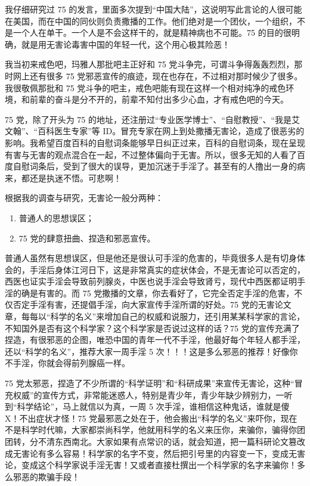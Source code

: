 \documentclass{ctexart}
\begin{document}
我仔细研究过 75 的发言，里面多次提到“中国大陆”，这说明写此言论的人很可能在美国，而在中国的同伙则负责撒播的工作。他们绝对是一个团伙，一个组织，不是一个人在单干。一个人是不会这样干的，就是精神病也不可能。75 的目的很明确，就是用无害论毒害中国的年轻一代，这个用心极其险恶！

我当初来戒色吧，玛雅人那批吧主正好和 75 党斗争完，可谓斗争得轰轰烈烈，那时网上还有很多 75 党邪恶宣传的痕迹，现在也存在，不过相对那时候少了很多。我很敬佩那批和 75 党斗争的吧主，戒色吧能有现在这样一个相对纯净的戒色环境，和前辈的奋斗是分不开的，前辈不知付出多少心血，才有戒色吧的今天。

75 党，除了开头为 75 的地址，还注册过“专业医学博士”、“自慰教授”、“我是艾文翰”、“百科医生专家”等 ID。冒充专家在网上到处撒播无害论，造成了很恶劣的影响。我希望百度百科的自慰词条能够早日纠正过来，百科的自慰词条，现在呈现有害与无害的观点混合在一起，不过整体偏向于无害。所以，很多无知的人看了百度自慰词条后，受到了很大的误导，更加沉迷于手淫了。甚至有的人撸出一身的病来，都还是执迷不悟。可悲啊！

根据我的调查与研究，无害论一般分两种：

\begin{enumerate}
    \item 普通人的思想误区；
    \item 75 党的肆意扭曲、捏造和邪恶宣传。
\end{enumerate}

普通人虽然有思想误区，但是他还是很认可手淫的危害的，毕竟很多人是有切身体会的，手淫后身体江河日下，这是非常真实的症状体会，不是无害论可以否定的，西医也证实手淫会导致前列腺炎，中医也说手淫会导致肾亏，现代中西医都证明手淫的确是有害的。而 75 党撒播的文章，你去看好了，它完全否定手淫的危害，不仅否定手淫有害，还提倡手淫，向大家宣传手淫所谓的好处。75 党的无害论文章，每每以“科学的名义”来增加自己的权威和说服力，还引用某某科学家的言论，不知国外是否有这个科学家？这个科学家是否说过这样的话？75 党的宣传充满了捏造，有很邪恶的企图，唯恐中国的青年一代不手淫，他最好每个年轻人都手淫，还以“科学的名义”，推荐大家一周手淫 5 次！！！这是多么邪恶的推荐！好像你不手淫，你就会得前列腺癌一样。

75 党太邪恶，捏造了不少所谓的“科学证明”和“科研成果”来宣传无害论，这种“冒充权威”的宣传方式，非常能迷惑人，特别是青少年，青少年缺少辨别力，一听到“科学结论”，马上就信以为真，一周 5 次手淫，谁相信这种鬼话，谁就是傻 X！不出症状才怪！75 党最邪恶之处在于，他会搬出“科学的名义”来吓你，现在不是科学时代嘛，大家都崇尚科学，他就用科学的名义来压你，来骗你，骗得你团团转，分不清东西南北。大家如果有点常识的话，就会知道，把一篇科研论文篡改成无害论有多么容易！科学家的名字不变，然后把引号里的内容变一下，变成无害论，变成这个科学家说手淫无害！又或者直接杜撰出一个科学家的名字来骗你！多么邪恶的欺骗手段！
\end{document}
